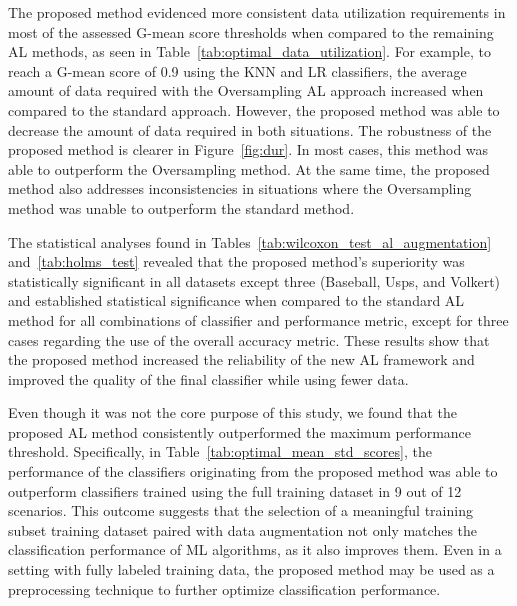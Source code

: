 The proposed method evidenced more consistent data utilization requirements
in most of the assessed G-mean score thresholds when compared to the
remaining AL methods, as seen in Table~\ref{tab:optimal_data_utilization}. For
example, to reach a G-mean score of 0.9 using the KNN and LR classifiers, the
average amount of data required with the Oversampling AL approach increased
when compared to the standard approach. However, the proposed method was able
to decrease the amount of data required in both situations. The robustness of
the proposed method is clearer in Figure~\ref{fig:dur}. In most cases, this
method was able to outperform the Oversampling method. At the same time,
the proposed method also addresses inconsistencies in situations where the
Oversampling method was unable to outperform the standard method.

The statistical analyses found in Tables~\ref{tab:wilcoxon_test_al_augmentation}
and~\ref{tab:holms_test} revealed that the proposed method's superiority was
statistically significant in all datasets except three (Baseball,
Usps, and Volkert) and established statistical significance when compared to
the standard AL method for all combinations of classifier and performance
metric, except for three cases regarding the use of the overall
accuracy metric. These results show that the proposed method increased the
reliability of the new AL framework and improved the quality of the final
classifier while using fewer data.

Even though it was not the core purpose of this study, we found that the
proposed AL method consistently outperformed the maximum performance
threshold. Specifically, in Table~\ref{tab:optimal_mean_std_scores}, the
performance of the classifiers originating from the proposed method was able
to outperform classifiers trained using the full training dataset in 9 out
of 12 scenarios. This outcome suggests that the selection of a
meaningful training subset training dataset paired with data augmentation not
only matches the classification performance of ML algorithms, as it also
improves them. Even in a setting with fully labeled training data, the
proposed method may be used as a preprocessing technique to further
optimize classification performance.

